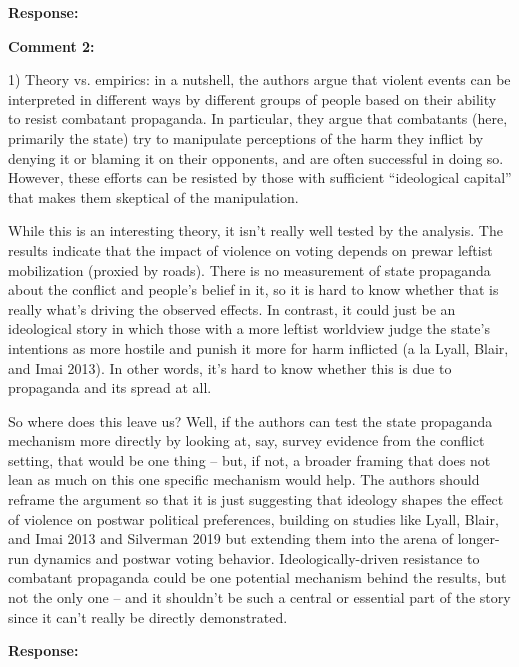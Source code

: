 \documentclass[12pt, a4paper, notitlepage]{article}
\begin{document}
\noindent\textbf{Response:}

\vspace{15pt}
\noindent\textbf{Comment 2:}
\begin{displayquote}
1) Theory vs. empirics: in a nutshell, the authors argue that violent events can be interpreted in different ways by different groups of people based on their ability to resist combatant propaganda. In particular, they argue that combatants (here, primarily the state) try to manipulate perceptions of the harm they inflict by denying it or blaming it on their opponents, and are often successful in doing so. However, these efforts can be resisted by those with sufficient “ideological capital” that makes them skeptical of the manipulation.

While this is an interesting theory, it isn’t really well tested by the analysis. The results indicate that the impact of violence on voting depends on prewar leftist mobilization (proxied by roads). There is no measurement of state propaganda about the conflict and people’s belief in it, so it is hard to know whether that is really what’s driving the observed effects. In contrast, it could just be an ideological story in which those with a more leftist worldview judge the state’s intentions as more hostile and punish it more for harm inflicted (a la Lyall, Blair, and Imai 2013). In other words, it’s hard to know whether this is due to propaganda and its spread at all.

So where does this leave us? Well, if the authors can test the state propaganda mechanism more directly by looking at, say, survey evidence from the conflict setting, that would be one thing – but, if not, a broader framing that does not lean as much on this one specific mechanism would help. The authors should reframe the argument so that it is just suggesting that ideology shapes the effect of violence on postwar political preferences, building on studies like Lyall, Blair, and Imai 2013 and Silverman 2019 but extending them into the arena of longer-run dynamics and postwar voting behavior. Ideologically-driven resistance to combatant propaganda could be one potential mechanism behind the results, but not the only one – and it shouldn’t be such a central or essential part of the story since it can’t really be directly demonstrated.
\end{displayquote}

\noindent\textbf{Response:}
\end{document}

